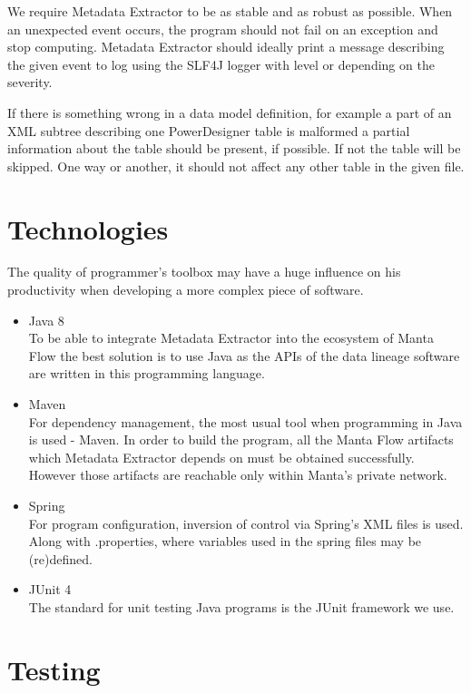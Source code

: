 We require Metadata Extractor to be as stable and as robust as possible. 
When an unexpected event occurs, the program should not fail on an exception and stop computing. Metadata Extractor should ideally print a message describing the given event to log using the SLF4J logger with level  or  depending on the severity. 

If there is something wrong in a data model definition, for example a part of an XML subtree describing one PowerDesigner table is malformed a partial information about the table should be present, if possible. If not the table will be skipped. One way or another, it should not affect any other table in the given file.

\section{Technologies}

The quality of programmer's toolbox may have a huge influence on his productivity when developing a more complex piece of software.

\begin{itemize}
	\item Java 8 \\
	To be able to integrate Metadata Extractor into the ecosystem of Manta Flow the best solution is to use Java as the APIs of the data lineage software are written in this programming language.
	\item Maven \\ 
	For dependency management, the most usual tool when programming in Java is used - Maven. In order to build the program, all the Manta Flow artifacts which Metadata Extractor depends on must be obtained successfully. However those artifacts are reachable only within Manta's private network.
	\item Spring \\
	For program configuration, inversion of control via Spring's XML files is used. Along with .properties, where variables used in the spring files may be (re)defined.
	\item JUnit 4 \\ 
	The standard for unit testing Java programs is the JUnit framework we use.
\end{itemize}

\section{Testing}

